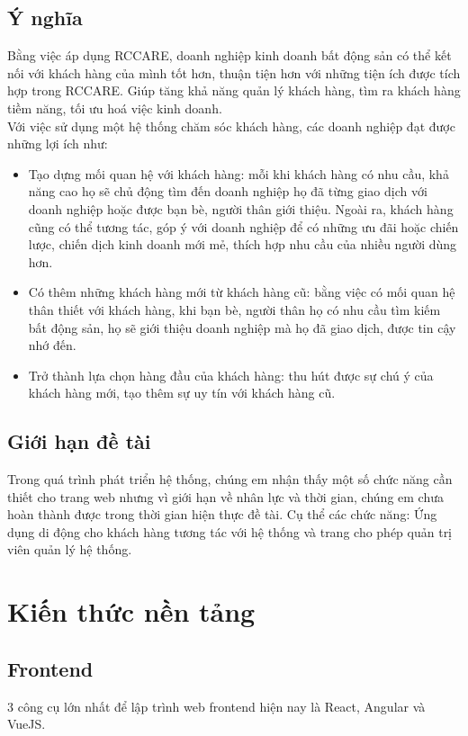 \documentclass[12pt,a4paper]{article}
\begin{document}
    \subsection*{Ý nghĩa}
    Bằng việc áp dụng RCCARE, doanh nghiệp kinh doanh bất động sản có thể kết nối với khách hàng của mình tốt hơn, thuận tiện hơn với những tiện ích được tích hợp trong RCCARE. Giúp tăng khả năng quản lý khách hàng, tìm ra khách hàng tiềm năng, tối ưu hoá việc kinh doanh.\\
    Với việc sử dụng một hệ thống chăm sóc khách hàng, các doanh nghiệp đạt được những lợi ích như:
    \begin{itemize}
        \item Tạo dựng mối quan hệ với khách hàng: mỗi khi khách hàng có nhu cầu, khả năng cao họ sẽ chủ động tìm đến doanh nghiệp họ đã từng giao dịch với doanh nghiệp hoặc được bạn bè, người thân giới thiệu. Ngoài ra, khách hàng cũng có thể tương tác, góp ý với doanh nghiệp để có những ưu đãi hoặc chiến lược, chiến dịch kinh doanh mới mẻ, thích hợp nhu cầu của nhiều người dùng hơn.
        \item Có thêm những khách hàng mới từ khách hàng cũ: bằng việc có mối quan hệ thân thiết với khách hàng, khi bạn bè, người thân họ có nhu cầu tìm kiếm bất động sản, họ sẽ giới thiệu doanh nghiệp mà họ đã giao dịch, được tin cậy nhớ đến.
        \item Trở thành lựa chọn hàng đầu của khách hàng: thu hút được sự chú ý của khách hàng mới, tạo thêm sự uy tín với khách hàng cũ.
    \end{itemize}

    \subsection*{Giới hạn đề tài}
    Trong quá trình phát triển hệ thống, chúng em nhận thấy một số chức năng cần thiết cho trang web nhưng vì giới hạn về nhân lực và thời gian, chúng em chưa hoàn thành được trong thời gian hiện thực đề tài. Cụ thể các chức năng: Ứng dụng di động cho khách hàng tương tác với hệ thống và trang cho phép quản trị viên quản lý hệ thống.

    \newpage


    \section{Kiến thức nền tảng}

    \subsection{Frontend}
    3 công cụ lớn nhất để lập trình web frontend hiện nay là React, Angular và VueJS.
\end{document}
